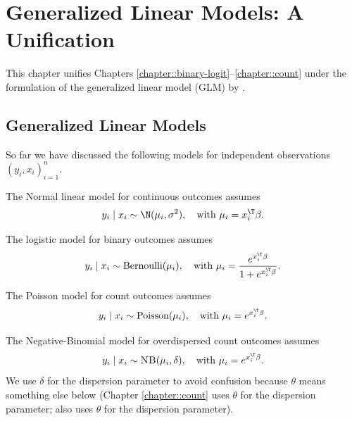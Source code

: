  
\chapter{Generalized Linear Models: A Unification}


This chapter unifies Chapters \ref{chapter::binary-logit}--\ref{chapter::count} under the formulation of the generalized linear model (GLM) by \citet{nelder1972generalized}. 



\section{Generalized Linear Models}

So far we have discussed the following models for independent observations
$(y_{i},x_{i})_{i=1}^{n}$.

\begin{example}\label{eg::gaussianlinearmodel}
The Normal linear model for continuous outcomes assumes
\begin{equation}
y_{i}\mid x_{i}\sim\N(\mu_{i},\sigma^{2}),\quad\text{with }\mu_{i}=x_{i}^{\T}\beta.\label{eq:gaussianlinearmodel}
\end{equation}
\end{example}


\begin{example}\label{eg::binarylogisticmodel}
The logistic model for binary outcomes assumes
\begin{equation}
y_{i}\mid x_{i}\sim\textup{Bernoulli}(\mu_{i}),\quad\text{with }\mu_{i}=\frac{e^{x_{i}^{\T}\beta}}{1+e^{x_{i}^{\T}\beta}} . \label{eq:logisticlinearmodel}
\end{equation}
\end{example}


\begin{example}\label{eg::countpoissonmodel}
The Poisson model for count outcomes assumes 
\begin{equation}
y_{i}\mid x_{i}\sim\textup{Poisson}(\mu_{i}),\quad\text{with }\mu_{i}=e^{x_{i}^{\T}\beta} . \label{eq:poissonlinearmodel}
\end{equation}
\end{example}


\begin{example}\label{eg::countnbmodel}
The Negative-Binomial model for overdispersed count outcomes assumes
\begin{equation}
y_{i}\mid x_{i}\sim\textsc{NB}(\mu_{i},\delta),\quad\text{with }\mu_{i}=e^{x_{i}^{\T}\beta} . \label{eq: nblinearmodel}
\end{equation}
We use $\delta$ for the dispersion parameter to avoid
confusion because $\theta$ means something else below (Chapter \ref{chapter::count} uses $\theta$ for the dispersion parameter;  also uses $\theta$ for the dispersion parameter). 
\end{example}

